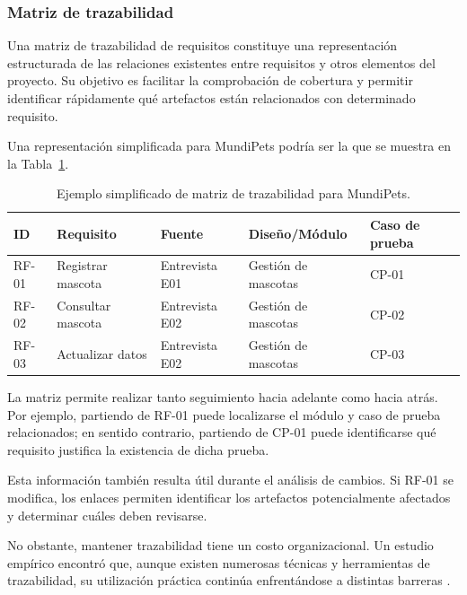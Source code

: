 \documentclass[journal,onecolumn]{IEEEtran}
\begin{document}
	\subsubsection{Matriz de trazabilidad}
	
	Una matriz de trazabilidad de requisitos constituye una representación estructurada de las relaciones existentes entre requisitos y otros elementos del proyecto. Su objetivo es facilitar la comprobación de cobertura y permitir identificar rápidamente qué artefactos están relacionados con determinado requisito.
	
	Una representación simplificada para MundiPets podría ser la que se muestra en la Tabla~\ref{tab:trazabilidad-simplificada}.
	
	\begin{table}[H]
		\centering
		\caption{Ejemplo simplificado de matriz de trazabilidad para MundiPets.}
		\label{tab:trazabilidad-simplificada}
		\small
		\begin{tabularx}{\textwidth}{@{}l X l l l@{}}
			\toprule
			\textbf{ID} & \textbf{Requisito} & \textbf{Fuente} & \textbf{Diseño/Módulo} & \textbf{Caso de prueba} \\
			\midrule
			RF-01 & Registrar mascota & Entrevista E01 & Gestión de mascotas & CP-01 \\
			RF-02 & Consultar mascota & Entrevista E02 & Gestión de mascotas & CP-02 \\
			RF-03 & Actualizar datos & Entrevista E02 & Gestión de mascotas & CP-03 \\
			\bottomrule
		\end{tabularx}
	\end{table}
	
	La matriz permite realizar tanto seguimiento hacia adelante como hacia atrás. Por ejemplo, partiendo de RF-01 puede localizarse el módulo y caso de prueba relacionados; en sentido contrario, partiendo de CP-01 puede identificarse qué requisito justifica la existencia de dicha prueba.
	
	Esta información también resulta útil durante el análisis de cambios. Si RF-01 se modifica, los enlaces permiten identificar los artefactos potencialmente afectados y determinar cuáles deben revisarse.
	
	No obstante, mantener trazabilidad tiene un costo organizacional. Un estudio empírico encontró que, aunque existen numerosas técnicas y herramientas de trazabilidad, su utilización práctica continúa enfrentándose a distintas barreras \cite{Ruiz2023}.
	
\end{document}
